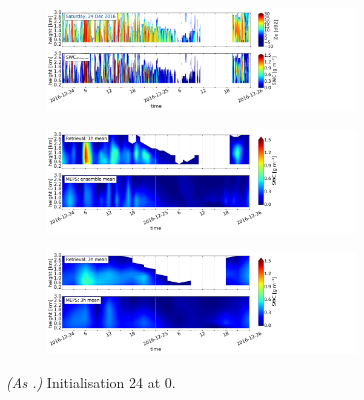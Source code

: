 \begin{figure}[H]%
	\centering
	\begin{subfigure}[t]{1.05\textwidth}
		\centering
		\includegraphics[trim={0.cm 2.2cm 19.cm 0.5cm},clip,width=0.9\textwidth]{./fig_obs_ret/20161224}
		\caption{}\label{fig:SWC:ret_24}
	\end{subfigure}
	\begin{subfigure}[t]{1.05\textwidth}
		\centering
		\includegraphics[trim={0.cm 2.2cm 19.cm 0.5cm},clip,width=0.9\textwidth]{./fig_vert_SWC_EM/20161224}
		\caption{}\label{fig:SWC_EM:24}
	\end{subfigure}
	\begin{subfigure}[t]{1.05\textwidth}
		\centering
		\includegraphics[trim={0.cm 0.8cm 19.cm 0.5cm},clip,width=0.9\textwidth]{./fig_vert_SWC_3h/20161224}
		\caption{}\label{fig:SWC3h:24}
	\end{subfigure}
	\caption{\textit{(As .)} Initialisation \SI{24}{\dec} at \SI{0}{\UTC}.}\label{fig:SWC24}
\end{figure}
